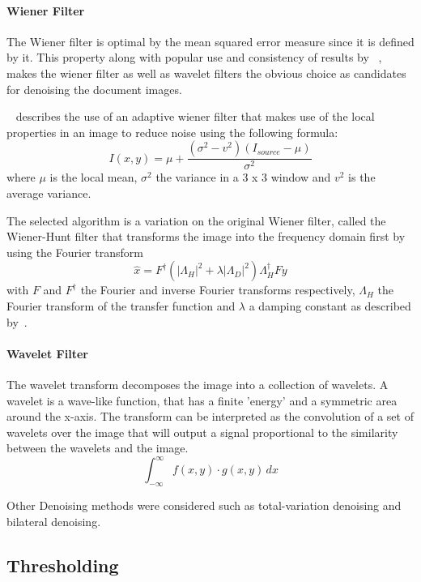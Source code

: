 \documentclass[a4paper, 12pt]{report}
\begin{document}
\paragraph{Wiener Filter}
The Wiener filter is optimal by the mean squared error measure since it is defined by it. This property along with popular use and consistency of results by ~\cite{6524379}, ~\cite{gatos2006adaptive} makes the wiener filter as well as wavelet filters the obvious choice as candidates for denoising the document images.
\par
~\cite{gatos2006adaptive} describes the use of an adaptive wiener filter that makes use of the local properties in an image to reduce noise using the following formula:
\[I(x,y)=\mu+\frac{(\sigma^2-v^2)(I_{source}-\mu)}{\sigma^2}\]
where \(\mu\) is the local mean, \(\sigma^2\) the variance in a 3 x 3 window and \(v^2\) is the average variance.
\par
The selected algorithm is a variation on the original Wiener filter, called the Wiener-Hunt filter that transforms the image into the frequency domain first by using the Fourier transform
\[\hat x = F^\dagger (|\Lambda_H|^2 + \lambda |\Lambda_D|^2)
    \Lambda_H^\dagger F y\]
with \(F\) and \(F^\dagger\) the Fourier and inverse Fourier transforms respectively, \(\Lambda_H\) the Fourier transform of the transfer function and \(\lambda\) a damping constant as described by~\cite{scikit-image}.

\paragraph{Wavelet Filter}
The wavelet transform decomposes the image into a collection of wavelets. A wavelet is a wave-like function, that has a finite 'energy' and a symmetric area around the x-axis. The transform can be interpreted as the convolution of a set of wavelets over the image that will output a signal proportional to the similarity between the wavelets and the image.
\[ \int_{-\infty}^{\infty} f(x,y) \cdot g(x,y) \,dx \]

\par
Other Denoising methods were considered such as total-variation denoising and bilateral denoising.

\subsection{Thresholding}
\end{document}
